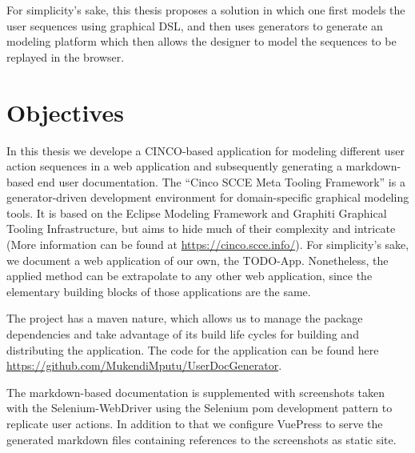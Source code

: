For simplicity's sake, this thesis proposes a solution in which one first models the user sequences using graphical DSL, and then uses generators to generate an modeling platform which then allows the designer to model the sequences to be replayed in the browser.

\section{Objectives}
In this thesis we develope a CINCO-based application for modeling different user action sequences in a web application and subsequently generating a markdown-based end user documentation. The “Cinco SCCE Meta Tooling Framework” is a generator-driven development environment for domain-specific graphical modeling tools. It is based on the Eclipse Modeling Framework and Graphiti Graphical Tooling Infrastructure, but aims to hide much of their complexity and intricate  (More information can be found at \url{https://cinco.scce.info/})\cite{Cinco}. For simplicity's sake, we document a web application of our own, the TODO-App. Nonetheless, the applied method can be extrapolate to any other web application, since the elementary building blocks of those applications are the same.

The project has a maven nature, which allows us to manage the package dependencies and take advantage of its build life cycles for building and distributing the application. The code for the application can be found here \url{https://github.com/MukendiMputu/UserDocGenerator}.

The markdown-based documentation is supplemented with screenshots taken with the Selenium-WebDriver using the \gls{Selenium} \acrfull{pom} development pattern to replicate user actions. In addition to that we configure \gls{VuePress} to serve the generated markdown files containing references to the screenshots as static site.

